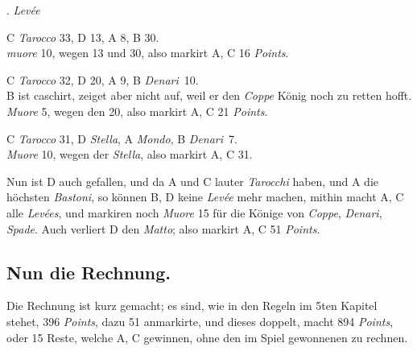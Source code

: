 \documentclass[11pt,a6paper,twoside]{article}
\newcounter{leveescnt}
\newenvironment{leveeslist}{
  \begin{list}
    {\arabic{leveescnt}. {\textit{Levée}}}
    {\usecounter{leveescnt}
      \setlength{\labelwidth}{2em}
      \setlength{\labelsep}{1em}
      \setlength{\itemsep}{0pt}
      \setlength{\parsep}{0pt}
      \setlength{\leftmargin}{1.5em}
      \setlength{\itemindent}{1em} %
    }
}{\end{list}}
\begin{document}
\begin{leveeslist}
\item C \textit{Tarocco} 33, D 13, A 8, B 30. \\\textit{muore} 10, wegen 13 und 30, also markirt A, C 16 \textit{Points}.
\item C \textit{Tarocco} 32, D 20, A 9, B \textit{Denari}~10. \\B ist caschirt, zeiget aber nicht auf, weil er den \textit{Coppe} König noch zu retten hofft. \textit{Muore} 5, wegen den 20, also markirt A, C 21 \textit{Points}.
\item C \textit{Tarocco} 31, D \textit{Stella}, A \textit{Mondo}, B \textit{Denari}~7. \\\textit{Muore} 10, wegen der \textit{Stella}, also markirt A, C 31.
\end{leveeslist}
Nun ist D auch gefallen, und da A und C lauter \textit{Tarocchi} haben, und A die höchsten \textit{Bastoni}, so können B, D keine \textit{Levée} mehr machen, mithin macht A, C alle \textit{Levées}, und markiren noch \textit{Muore} 15 für die Könige von \textit{Coppe}, \textit{Denari}, \textit{Spade}. Auch verliert D den \textit{Matto}; also markirt A, C 51 \textit{Points}.

\subsection{Nun die Rechnung.}

Die Rechnung ist kurz gemacht; es sind, wie in den Regeln im 5ten Kapitel stehet, 396 \textit{Points}, dazu 51 anmarkirte, und dieses doppelt, macht 894 \textit{Points}, oder 15 Reste, welche A, C gewinnen, ohne den im Spiel gewonnenen zu rechnen.
\end{document}
